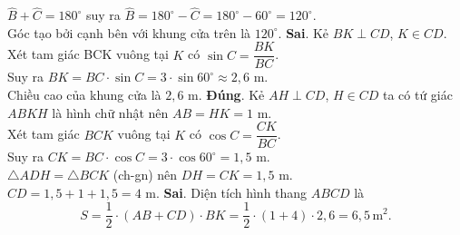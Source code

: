 \begin{ex}
{\begin{itemchoice}
	$\widehat{B} + \widehat{C} = 180^\circ$ suy ra $\widehat{B} = 180^\circ - \widehat{C} = 180^\circ - 60^\circ = 120^\circ$.\\
	Góc tạo bởi cạnh bên với khung cửa trên là $120^\circ$.
	\itemch \textbf{Sai}. Kẻ $BK \perp CD$, $K \in CD$.\\
	Xét tam giác BCK vuông tại $K$ có $\sin C = \dfrac{BK}{BC}$.\\
	Suy ra $BK = BC \cdot \sin C = 3 \cdot \sin 60^\circ \approx 2{,}6$ m.\\
	Chiều cao của khung cửa là $2{,}6$ m.
	\itemch \textbf{Đúng}. Kẻ $AH \perp CD$, $H \in CD$ ta có tứ giác $ABKH$ là hình chữ nhật nên $AB = HK = 1$ m.\\
	Xét tam giác $BCK$ vuông tại $K$ có $\cos C = \dfrac{CK}{BC}$.\\
	Suy ra $CK = BC \cdot \cos C = 3 \cdot \cos 60^\circ = 1{,}5$ m.\\
	$\triangle ADH = \triangle BCK$ (ch-gn) nên $DH = CK = 1{,}5$ m.\\
	$CD = 1{,}5 + 1 + 1{,}5 = 4$ m.
	\itemch \textbf{Sai}. Diện tích hình thang $ABCD$ là 
	$$S = \dfrac{1}{2} \cdot (AB + CD)\cdot BK = \dfrac{1}{2} \cdot (1 + 4) \cdot 2{,}6 = 6{,}5\,\mathrm{m}^2.$$ 
	\end{itemchoice}
	}
\end{ex}
